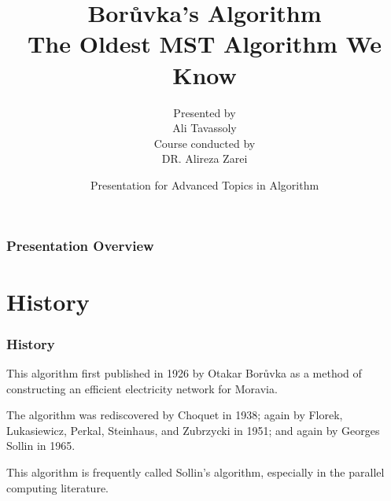 \documentclass[
	11pt, %
]{beamer}
\title[Blockchain]{Borůvka's Algorithm \\ The Oldest MST Algorithm We Know} %
\author[]{ Presented by \\ Ali Tavassoly \\ \vspace*{0.5cm} Course conducted by \\ DR. Alireza Zarei} %
\institute[]{Sharif University of Technology } %
\date[]{ Presentation for Advanced Topics in Algorithm} %
\begin{document}

\begin{frame}
	\titlepage %
\end{frame}



\begin{frame}
	\frametitle{Presentation Overview} %
	
	\tableofcontents %
\end{frame}

\section{History}
\begin{frame}
    \tableofcontentscurrent
\end{frame}

\begin{frame}
    \frametitle{History}
    This algorithm first published in 1926 by Otakar Borůvka as 
    a method of constructing an efficient electricity 
    network for Moravia.

    The algorithm was rediscovered by Choquet in 1938;
    again by Florek, Lukasiewicz, Perkal, Steinhaus, 
    and Zubrzycki in 1951; and again by Georges Sollin 
    in 1965.

    This algorithm is frequently called Sollin's algorithm, 
    especially in the parallel computing literature.
\end{frame}
\end{document}
